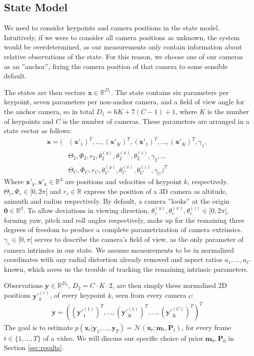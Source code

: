\documentclass[sigconf, nonacm]{acmart}
\begin{document}
\subsection{State Model}
We need to consider keypoints and camera positions in the state model. Intuitively, if we were to consider all camera positions as unknown, the system would be overdetermined, as our measurements only contain information about relative observations of the state. For this reason, we choose one of our cameras as an ''anchor'', fixing the camera position of that camera to some sensible default. \par
The states are then vectors $\mathbf{x} \in \mathbb{R}^{D_1}$. The state contains six parameters per keypoint, seven parameters per non-anchor camera, and a field of view angle for the anchor camera, so in total $D_1 = 6K + 7(C - 1) + 1$, where $K$ is the number of keypoints and $C$ is the number of cameras. These parameters are arranged in a state vector as follows:
\begin{align*}
    \mathbf{x} = (&(\mathbf{x}'_1)^T, ..., (\mathbf{x}'_K)^T, (\dot{\mathbf{x}}'_1)^T, ...,(\dot{\mathbf{x}}'_K)^T, \gamma_1,\\
    & \Theta_2, \Phi_2, r_2, \theta_{2}^{(y)},\theta_{2}^{(x)},\theta_{2}^{(z)}, \gamma_2, ...\\
    & \Theta_C, \Phi_C, r_C,\theta_{C}^{(y)},\theta_{C}^{(x)},\theta_{C}^{(z)}, \gamma_C
    )^T
\end{align*}
Where $\mathbf{x}'_k, \dot{\mathbf{x}}'_k \in \mathbb{R}^3$ are positions and velocities of keypoint $k$, respectively. $\Theta_c, \Phi_c \in [0, 2\pi[$ and $r_c \in \mathbb{R}$ express the position of a 3D camera as altitude, azimuth and radius respectively. By default, a camera ''looks'' at the origin $\mathbf{0}\in \mathbb{R}^3$. To allow deviations in viewing direction, $\theta_{c}^{(y)},\theta_{c}^{(x)},\theta_{c}^{(z)} \in [0, 2\pi[$, forming yaw, pitch and roll angles respectively, make up for the remaining three degrees of freedom to produce a complete parametrization of camera extrinsics. $\gamma_c \in [0,\pi[$ serves to describe the camera's field of view, as the only parameter of camera intrinsics in our state. We assume measurements to be in normalized coordinates with any radial distortion already removed and aspect ratios $a_1, ..., a_C$ known, which saves us the trouble of tracking the remaining intrinsic parameters. \par
Observations $\mathbf{y} \in \mathbb{R}^{D_2}$, $D_2 = C\cdot K\cdot2$, are then simply these normalized 2D positions $\mathbf{y'}_k^{(c)}$, of every keypoint $k$, seen from every camera $c$:
\begin{align*}
    \mathbf{y} = ((\mathbf{y'}_1^{(1)})^T, ..., (\mathbf{y'}_K^{(1)})^T, ...,(\mathbf{y'}_K^{(C)})^T)^T
\end{align*}
The goal is to estimate $p(\mathbf{x}_t |\mathbf{y}_1, ...,\mathbf{y}_T) = \mathcal{N}(\mathbf{x}_t; \mathbf{m}_t, \mathbf{P}_t)$, for every frame $t \in \{1, ..., T\}$ of a video. We will discuss our specific choice of prior $\mathbf{m}_0, \mathbf{P}_0$ in Section \ref{sec:results}.
\end{document}
